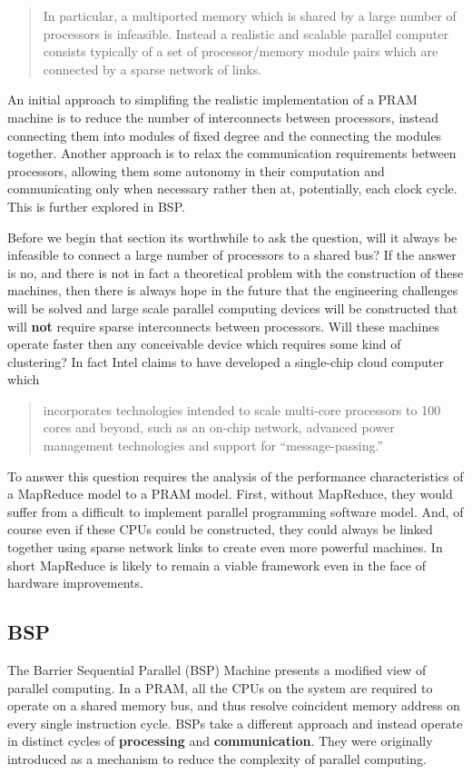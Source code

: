 \documentclass{article}
\begin{document}
\begin{quotation}
In particular, a multiported memory which is shared by a large number of processors is infeasible. Instead a realistic and scalable parallel computer consists typically of a set of processor/memory module pairs which are connected by a sparse network of links. 
\end{quotation}

An initial approach to simplifing the realistic implementation of a PRAM machine is to reduce the number of interconnects between processors, instead connecting them into modules of fixed degree and the connecting the modules together. Another approach is to relax the communication requirements between processors, allowing them some autonomy in their computation and communicating only when necessary rather then at, potentially, each clock cycle. This is further explored in BSP.

Before we begin that section its worthwhile to ask the question, will it always be infeasible to connect a large number of processors to a shared bus? If the answer is no, and there is not in fact a theoretical problem with the construction of these machines, then there is always hope in the future that the engineering challenges will be solved and large scale parallel computing devices will be constructed that will {\bf not} require sparse interconnects between processors. Will these machines operate faster then any conceivable device which requires some kind of clustering? In fact Intel claims to have developed a single-chip cloud computer which 

\begin{quotation}
incorporates technologies intended to scale multi-core processors to 100 cores and beyond, such as an on-chip network, advanced power management technologies and support for “message-passing.” \cite{intel}
\end{quotation}

To answer this question requires the analysis of the performance characteristics of a MapReduce model to a PRAM model. First, without MapReduce, they would suffer from a difficult to implement parallel programming software model. And, of course even if these CPUs could be constructed, they could always be linked together using sparse network links to create even more powerful machines. In short MapReduce is likely to remain a viable framework even in the face of hardware improvements. 

\subsection{BSP}
The Barrier Sequential Parallel (BSP) Machine presents a modified view of parallel computing. In a PRAM, all the CPUs on the system are required to operate on a shared memory bus, and thus resolve coincident memory address on every single instruction cycle. BSPs take a different approach and instead operate in distinct cycles of {\bf processing} and {\bf communication}. They were originally introduced as a mechanism to reduce the complexity of parallel computing. 
\end{document}
